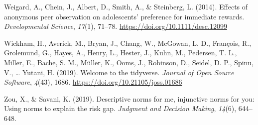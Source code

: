 \documentclass[
  pub,floatsintext]{apa6}
\newlength{\cslhangindent}
\newlength{\cslentryspacingunit} %
\newenvironment{CSLReferences}[2] %
 {%
  \setlength{\parindent}{0pt}
  \ifodd #1
  \let\oldpar\par
  \def\par{\hangindent=\cslhangindent\oldpar}
  \fi
  \setlength{\parskip}{#2\cslentryspacingunit}
 }%
 {}
\begin{document}
\begin{CSLReferences}{1}{0}
\leavevmode{}%
Weigard, A., Chein, J., Albert, D., Smith, A., \& Steinberg, L. (2014). Effects of anonymous peer observation on adolescents' preference for immediate rewards. \emph{Developmental Science}, \emph{17}(1), 71--78. \url{https://doi.org/10.1111/desc.12099}

\leavevmode{}%
Wickham, H., Averick, M., Bryan, J., Chang, W., McGowan, L. D., François, R., Grolemund, G., Hayes, A., Henry, L., Hester, J., Kuhn, M., Pedersen, T. L., Miller, E., Bache, S. M., Müller, K., Ooms, J., Robinson, D., Seidel, D. P., Spinu, V., \ldots{} Yutani, H. (2019). Welcome to the {tidyverse}. \emph{Journal of Open Source Software}, \emph{4}(43), 1686. \url{https://doi.org/10.21105/joss.01686}

\leavevmode{}%
Zou, X., \& Savani, K. (2019). Descriptive norms for me, injunctive norms for you: {Using} norms to explain the risk gap. \emph{Judgment and Decision Making}, \emph{14}(6), 644--648.

\end{CSLReferences}
\end{document}
